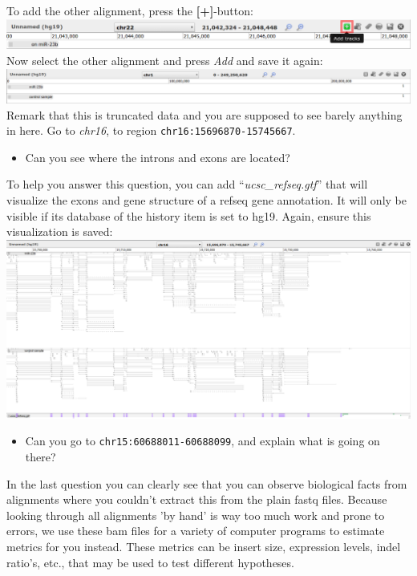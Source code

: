 To add the other alignment, press the \textbf{[+]}-button:\\
\includegraphics[width=\textwidth]{figures/alignment_06.png}\\
Now select the other alignment and press \textit{Add} and save it again:\\
\includegraphics[width=\textwidth]{figures/alignment_07.png}\\
Remark that this is truncated data and you are supposed to see barely anything in here. Go to \textit{chr16}, to region \verb|chr16:15696870-15745667|.
\begin{itemize}
	\item Can you see where the introns and exons are located?
\end{itemize}
To help you answer this question, you can add ``\textit{ucsc\_refseq.gtf}'' that will visualize the exons and gene structure of a refseq gene annotation. It will only be visible if its database of the history item is set to hg19. Again, ensure this visualization is saved:\\
\includegraphics[width=\textwidth]{figures/alignment_08.png}\\
\begin{itemize}
	\item Can you go to \verb|chr15:60688011-60688099|, and explain what is going on there?
\end{itemize}
In the last question you can clearly see that you can observe biological facts from alignments where you couldn't extract this from the plain fastq files.
Because looking through all alignments 'by hand' is way too much work and prone to errors, we use these bam files for a variety of computer programs to estimate metrics for you instead.
These metrics can be insert size, expression levels, indel ratio's, etc., that may be used to test different hypotheses.


